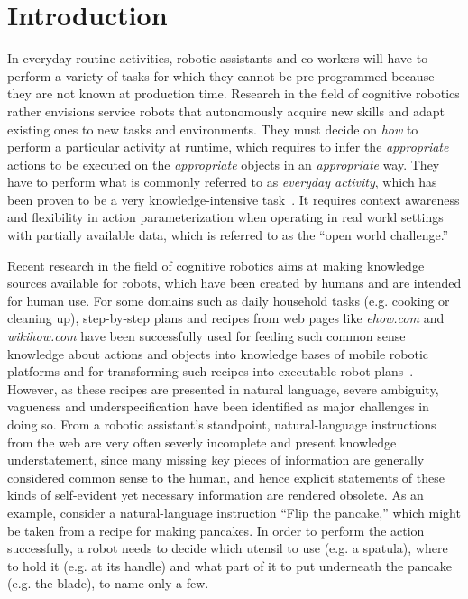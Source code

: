 \documentclass[oribibl]{llncs}
\begin{document}
\section{Introduction} 

In everyday routine activities, robotic assistants and co-workers 
will have to perform a variety of tasks for which they cannot be 
pre-programmed because they are not known at production time. 
Research in the field of cognitive robotics rather envisions service 
robots that autonomously acquire new skills and adapt existing ones 
to new tasks and environments. They must decide on \textit{how} to 
perform a particular activity at runtime, which requires to infer 
the \textit{appropriate} actions to be executed on the \textit 
{appropriate} objects in an \textit{appropriate} way. They have to 
perform what is commonly referred to as \textit{everyday activity}, 
which has been proven to be a very knowledge-intensive task~\cite 
{anderson95phd, nyga12actioncore}. It requires context awareness and 
flexibility in action parameterization when operating in real world 
settings with partially available data, which is referred to as the 
``open world challenge.'' 

Recent research in the field of cognitive robotics aims at making 
knowledge sources available for robots, which have been created by 
humans and are intended for human use. For some domains such as 
daily household tasks (e.g. cooking or cleaning up), step-by-step 
plans and recipes from web pages like \textit {ehow.com} and \textit 
{wikihow.com} have been successfully used for feeding such common 
sense knowledge about actions and objects into knowledge bases of 
mobile robotic platforms and for transforming such recipes into 
executable robot plans~\cite{tenorth10webinstructions}. However, as 
these recipes are presented in natural language, severe ambiguity, 
vagueness and underspecification have been identified as major 
challenges in doing so. From a robotic assistant's standpoint, 
natural-language instructions from the web are very often severly 
incomplete and present knowledge understatement, since many missing 
key pieces of information are generally considered common sense to 
the human, and hence explicit statements of these kinds of 
self-evident yet necessary information are rendered obsolete. As an 
example, consider a natural-language instruction ``Flip the 
pancake,'' which might be taken from a recipe for making pancakes. 
In order to perform the action successfully, a robot needs to decide 
which utensil to use (e.g. a spatula), where to hold it (e.g. at its 
handle) and what part of it to put underneath the pancake (e.g. the 
blade), to name only a few.
\end{document}
